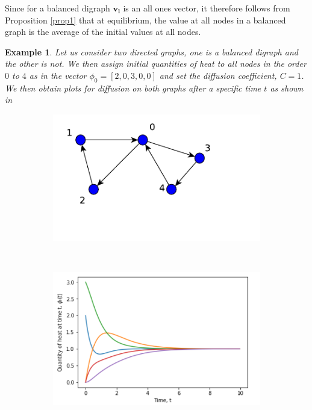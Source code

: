 \documentclass[10pt,a4paper]{article}
\newtheorem{exa}{Example}
\begin{document}
      Since for a balanced digraph $\mathbf{v_l}$ is an all ones vector, it therefore follows from Proposition \ref{prop1} that at equilibrium, the value at all nodes in a balanced graph is the average of the initial values at all nodes.
      
      \begin{exa}
      	Let us consider two directed graphs, one is a balanced digraph and the other is not. We then assign initial quantities of heat to all nodes in the order $0$ to $4$ as in the vector $\phi_0=[2,0,3,0,0]$ and set the diffusion coefficient, $C=1$. We then obtain plots for diffusion on both graphs after a specific time $t$ as shown in 
      	
      	\begin{figure}[H]
      		\centering
      	    \begin{subfigure}[b]{0.40\textwidth}
      	    	\includegraphics[width=\textwidth]{images/balanceDigraph.pdf}
      	    	\caption{}
      	    	\label{balanced-graph}
      	    \end{subfigure}~
      	    \begin{subfigure}[b]{0.5\textwidth}
      	    	\includegraphics[width= \textwidth]{images/Balanced-digraph-diffusion.png}

\end{subfigure}
\end{figure}
\end{exa}
\end{document}
